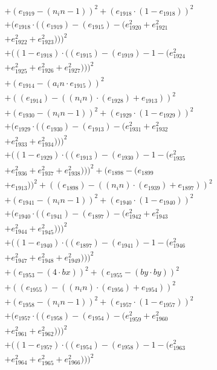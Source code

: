 \documentclass[10pt, a4paper]{article}
\begin{document}
\begin{small}
\begin{align*}
& + (e_{1919} - (n_in - 1))^{2} + (e_{1918}  \cdot  (1 - e_{1918}))^{2} \\
& + (e_{1918}  \cdot  ((e_{1919}) - (e_{1915}) - (e_{1920}^{2} + e_{1921}^{2} \\
& + e_{1922}^{2} + e_{1923}^{2})))^{2} \\
& + ((1 - e_{1918})  \cdot  ((e_{1915}) - (e_{1919}) - 1 - (e_{1924}^{2} \\
& + e_{1925}^{2} + e_{1926}^{2} + e_{1927}^{2})))^{2} \\
& + (e_{1914} - (a_in  \cdot  e_{1915}))^{2} \\
& + ((e_{1914}) - ((n_in)  \cdot  (e_{1928}) + e_{1913}))^{2} \\
& + (e_{1930} - (n_in - 1))^{2} + (e_{1929}  \cdot  (1 - e_{1929}))^{2} \\
& + (e_{1929}  \cdot  ((e_{1930}) - (e_{1913}) - (e_{1931}^{2} + e_{1932}^{2} \\
& + e_{1933}^{2} + e_{1934}^{2})))^{2} \\
& + ((1 - e_{1929})  \cdot  ((e_{1913}) - (e_{1930}) - 1 - (e_{1935}^{2} \\
& + e_{1936}^{2} + e_{1937}^{2} + e_{1938}^{2})))^{2} + (e_{1898} - (e_{1899} \\
& + e_{1913}))^{2} + ((e_{1898}) - ((n_in)  \cdot  (e_{1939}) + e_{1897}))^{2} \\
& + (e_{1941} - (n_in - 1))^{2} + (e_{1940}  \cdot  (1 - e_{1940}))^{2} \\
& + (e_{1940}  \cdot  ((e_{1941}) - (e_{1897}) - (e_{1942}^{2} + e_{1943}^{2} \\
& + e_{1944}^{2} + e_{1945}^{2})))^{2} \\
& + ((1 - e_{1940})  \cdot  ((e_{1897}) - (e_{1941}) - 1 - (e_{1946}^{2} \\
& + e_{1947}^{2} + e_{1948}^{2} + e_{1949}^{2})))^{2} \\
& + (e_{1953} - (4  \cdot  bx))^{2} + (e_{1955} - (by  \cdot  by))^{2} \\
& + ((e_{1955}) - ((n_in)  \cdot  (e_{1956}) + e_{1954}))^{2} \\
& + (e_{1958} - (n_in - 1))^{2} + (e_{1957}  \cdot  (1 - e_{1957}))^{2} \\
& + (e_{1957}  \cdot  ((e_{1958}) - (e_{1954}) - (e_{1959}^{2} + e_{1960}^{2} \\
& + e_{1961}^{2} + e_{1962}^{2})))^{2} \\
& + ((1 - e_{1957})  \cdot  ((e_{1954}) - (e_{1958}) - 1 - (e_{1963}^{2} \\
& + e_{1964}^{2} + e_{1965}^{2} + e_{1966}^{2})))^{2} \\

\end{align*}
\end{small}
\end{document}

